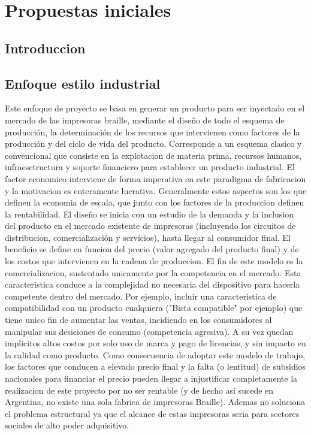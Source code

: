 \chapter{Propuestas iniciales}
\section{Introduccion} 
\section {Enfoque estilo industrial}
Este enfoque de proyecto se basa en generar un producto para ser inyectado en
el mercado de las impresoras braille, mediante el dise\~no de todo el esquema 
de producci\'on, la determinaci\'on de los recursos que intervienen como
factores de la producci\'on y del ciclo de vida del producto. Corresponde a un
esquema clasico y convencional que consiste en la explotacion de materia prima,
recursos humanos, infraesctructura y soporte financiero para establecer un
producto industrial. El factor economico interviene de forma imperativa en este
paradigma de fabricacion y la motivacion es enteramente lucrativa. 
Generalmente estos aspectos son los que definen la economia de escala, que
junto con los factores de la produccion definen la rentabilidad.
El dise\~no se inicia con un estudio de la demanda y la inclusion del producto 
en el mercado existente de impresoras (incluyendo los circuitos de
distribucion, comercializaci\'on y servicios), hasta llegar al consumidor
final.
El beneficio se define en funcion del precio (valor agregado del producto
final) y de los costos que intervienen en la cadena de produccion. 
El fin de este modelo es la comercializacion, sustentado unicamente por la
competencia en el mercado. 
Esta caracteristica conduce a la complejidad no necesaria del dispositivo para
hacerla competente dentro del mercado. Por ejemplo, incluir una caracteristica
de compatibilidad con un producto cualquiera ("Bista compatible" por ejemplo) 
que tiene unico fin de aumentar las ventas, incidiendo en los consumidores al
manipular sus desiciones de consumo (competencia agresiva).
A su vez quedan implicitos altos costos por solo uso de marca y pago de 
licencias, y sin impacto en la calidad como producto.
Como consecuencia de adoptar este modelo de trabajo, los factores que conducen
a elevado precio final y la falta (o lentitud) de subsidios nacionales
para financiar el precio pueden llegar a injustificar completamente la 
realizacion de este proyecto por no ser rentable (y de hecho asi sucede en
Argentina, no existe una sola fabrica de impresoras Braille).
Ademas no soluciona el problema estructural ya que el alcance de estas
impresoras seria para sectores sociales de alto poder adquisitivo.
